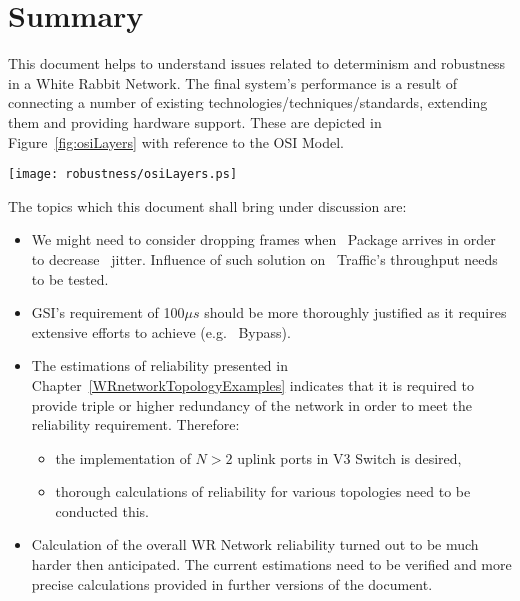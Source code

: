 \chapter{Summary}


This document helps to understand issues related to determinism and robustness
in a White Rabbit Network. The final system's performance is a result of
connecting a number of existing technologies/techniques/standards, extending
them and providing hardware support. These are depicted in
Figure~\ref{fig:osiLayers} with reference to the OSI Model. 


\begin{center}
	\texttt{[image: robustness/osiLayers.ps]}
	\label{fig:osiLayers}
\end{center}

The topics which this document shall bring under discussion are:
\begin{itemize}
    \item We might need to consider dropping frames when \HP\ Package arrives in
order to decrease \ControlMessage\ jitter. Influence of such solution
on \SP\ Traffic's throughput needs to be tested.
    \item GSI's requirement of 100$\mu s$ should be more thoroughly justified as
it requires extensive efforts to achieve (e.g. \HP\ Bypass).
    \item The estimations of reliability presented in
Chapter~\ref{WRnetworkTopologyExamples} indicates that it is required to
provide triple or higher redundancy of the network in order to meet the
reliability requirement. Therefore:
   \begin{itemize}
      \item the implementation of $N > 2$ uplink ports in V3 Switch is desired,
      \item thorough calculations of reliability for various topologies need to
	    be conducted this.
   \end{itemize}
 \item Calculation of the overall WR Network
reliability turned out to be
much harder then anticipated. The current estimations need to be verified and
more precise calculations provided in further versions of the document.
\end{itemize}



